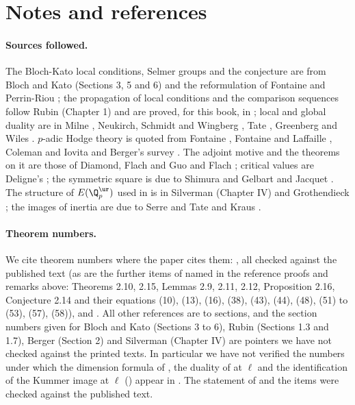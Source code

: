 \section{Notes and references}\label{sec:blochkato:notes}

\paragraph{Sources followed.} The Bloch-Kato local conditions, Selmer groups and the conjecture are from Bloch and Kato \cite{BlochKato} (Sections 3, 5 and 6) and
the reformulation of Fontaine and Perrin-Riou \cite{FPR94}; the propagation of local conditions and the comparison sequences follow Rubin \cite{Rubin} (Chapter 1) and
are proved, for this book, in ; local and global duality are in Milne \cite{MilneADT}, Neukirch, Schmidt and Wingberg \cite{NSW}, Tate \cite{TateDuality},
Greenberg \cite{Greenberg89} and Wiles \cite{Wiles95}. $p$-adic Hodge theory is quoted from Fontaine \cite{Fontaine}, Fontaine and Laffaille \cite{FontaineLaffaille},
Coleman and Iovita \cite{ColemanIovita99} and Berger's survey \cite{Berger}. The adjoint motive and the theorems on it are those of Diamond, Flach and Guo \cite{DFG04} and Flach
\cite{Flach92}; critical values are Deligne's \cite{Deligne79}; the symmetric square is due to Shimura \cite{Shimura76} and Gelbart and Jacquet \cite{GelbartJacquet}. The
structure of $E(\Q_p^{\ur})$ used in  is in Silverman \cite{SilvermanATAEC} (Chapter IV) and Grothendieck \cite{SGA7}; the images of inertia
are due to Serre and Tate \cite{SerreTate68} and Kraus \cite{Kraus90}.

\paragraph{Theorem numbers.} We cite theorem numbers where the paper cites them: \cite[Theorems 0.1, 2.7, 3.7, Lemma 2.1, (31), (57), p.~708]{DFG04}, all
checked against the published text (as are the further items of \cite{DFG04} named in the reference proofs and remarks above: Theorems 2.10, 2.15, Lemmas 2.9, 2.11, 2.12,
Proposition 2.16, Conjecture 2.14 and their equations (10), (13), (16), (38), (43), (44), (48), (51) to (53), (57), (58)), and
\cite[I.4.2.2]{FPR94}. All other references are to sections, and the section numbers given for Bloch and Kato (Sections 3 to 6), Rubin (Sections 1.3 and 1.7), Berger
(Section 2) and Silverman (Chapter IV) are pointers we have not checked against the printed texts. In particular we have not verified the numbers under which the
dimension formula of , the duality of  at $\ell$ and the identification of the Kummer image at
$\ell$ () appear in \cite{BlochKato}. The statement of  and the items \cite[Theorem 1, Propositions 1.1, 2.2]{Flach92} were
checked against the published text.


